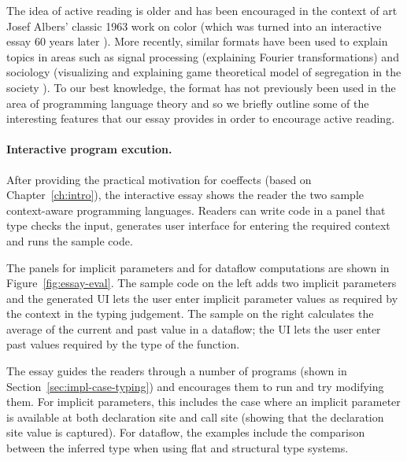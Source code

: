 The idea of active reading is older and has been encouraged in the context of art Josef Albers'
classic 1963 work on color \cite{essay-albers} (which was turned into an interactive essay
60 years later \cite{essay-albers-app}). More recently, similar formats have been used to explain
topics in areas such as signal processing \cite{essay-seeing} (explaining Fourier transformations)
and sociology \cite{essay-polygons} (visualizing and explaining game theoretical model of segregation
in the society \cite{essay-segregation}). To our best knowledge, the format has not previously
been used in the area of programming language theory and so we briefly outline some of the
interesting features that our essay provides in order to encourage active reading.

\paragraph{Interactive program excution.}

After providing the practical motivation for coeffects (based on Chapter~\ref{ch:intro}), the
interactive essay shows the reader the two sample context-aware programming languages. Readers can
write code in a panel that type checks the input, generates user interface for entering the
required context and runs the sample code.

The panels for implicit parameters and for dataflow computations are shown in Figure~\ref{fig:essay-eval}.
The sample code on the left adds two implicit parameters and the generated UI lets the user
enter implicit parameter values as required by the context in the typing judgement. The sample on
the right calculates the average of the current and past value in a dataflow; the UI lets the user
enter past values required by the type of the function.

The essay guides the readers through a number of programs (shown in Section~\ref{sec:impl-case-typing})
and encourages them to run and try modifying them. For implicit parameters, this includes the case
where an implicit parameter is available at both declaration site and call site (showing that the
declaration site value is captured). For dataflow, the examples include the comparison between the
inferred type when using flat and structural type systems.


